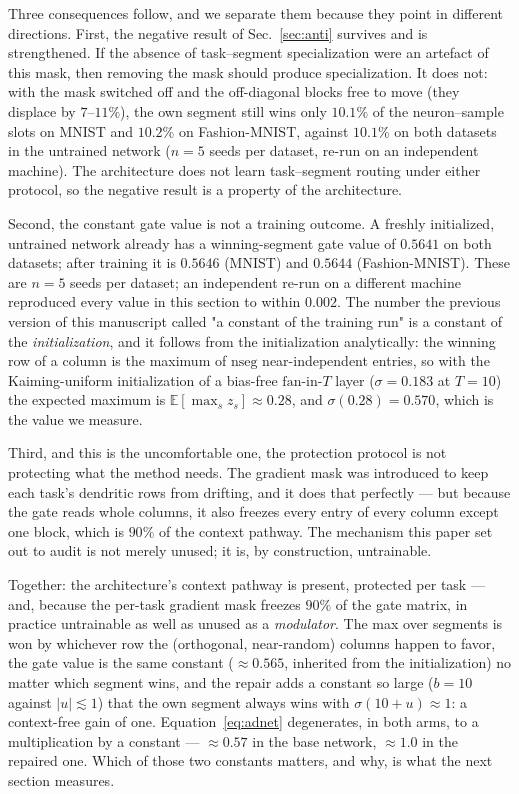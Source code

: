 \documentclass[10pt]{article}
\begin{document}
Three consequences follow, and we separate them because they point in
different directions. First, the negative result of
Sec.~\ref{sec:anti} survives and is strengthened. If the absence of
task--segment specialization were an artefact of this mask, then
removing the mask should produce specialization. It does not: with the
mask switched off and the off-diagonal blocks free to move (they
displace by $7$--$11\%$), the own segment still wins only
$10.1\%$ of the neuron--sample slots on MNIST and $10.2\%$ on
Fashion-MNIST, against $10.1\%$ on both datasets in the untrained network
($n=5$ seeds per dataset, re-run on an independent machine).
The architecture does not learn task--segment routing under either
protocol, so the negative result is a property of the architecture.

Second, the constant gate value is not a training outcome. A freshly
initialized, untrained network already has a winning-segment gate value
of $0.5641$ on both datasets; after training it is $0.5646$
(MNIST) and $0.5644$ (Fashion-MNIST). These are $n=5$ seeds per dataset;
an independent re-run on a different machine reproduced every value in this
section to within $0.002$. The number the previous version of
this manuscript called "a constant of the training run" is a constant of
the \emph{initialization}, and it follows from the initialization
analytically: the winning row of a column is the maximum of
$\text{nseg}$ near-independent entries, so with the Kaiming-uniform
initialization of a bias-free $\text{fan}$-in-$T$ layer
($\sigma = 0.183$ at $T = 10$) the expected maximum is
$\mathbb{E}[\max_{s} z_s] \approx 0.28$, and
$\sigma(0.28) = 0.570$, which is the value we measure.

Third, and this is the uncomfortable one, the protection protocol is
not protecting what the method needs. The gradient mask was introduced
to keep each task's dendritic rows from drifting, and it does that
perfectly --- but because the gate reads whole columns, it also freezes
every entry of every column except one block, which is $90\%$ of the
context pathway. The mechanism this paper set out to audit is not merely
unused; it is, by construction, untrainable.

Together: the architecture's context pathway is present, protected per
task --- and, because the per-task gradient mask freezes $90\%$ of the
gate matrix, in practice untrainable as well as unused as a
\emph{modulator}. The max over segments is won by whichever row the
(orthogonal, near-random) columns happen to favor, the gate value is the
same constant ($\approx 0.565$, inherited from the initialization) no
matter which segment wins, and the repair adds a constant so large
($b{=}10$ against $|u| \lesssim 1$) that the own segment always wins
with $\sigma(10 + u) \approx 1$: a context-free gain of one. Equation~\ref{eq:adnet} degenerates, in both arms, to a
multiplication by a constant --- ${\approx}0.57$ in the base network,
${\approx}1.0$ in the repaired one. Which of those two constants
matters, and why, is what the next section measures.
\end{document}
